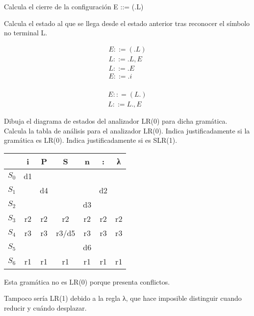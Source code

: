 \documentclass[nochap]{apuntes}
\begin{document}
\begin{problem}[3]
\ppart Calcula el cierre de la configuración E ::= (.L)

\ppart Calcula el estado al que se llega desde el estado anterior tras reconocer el símbolo no terminal L.
\solution

\spart
\begin{align*}
E ::= (.L)\\
L ::= .L,E\\
L ::= .E\\
E ::= .i\\
\end{align*}
\spart

\begin{align*}
E :: =(L.)\\
L ::= L.,E
\end{align*}
\end{problem}


\begin{problem}[4]

\ppart Dibuja el diagrama de estados del analizador LR(0) para dicha gramática.
\ppart Calcula la tabla de análisis para el analizador LR(0).
\ppart Indica justificadamente si la gramática es LR(0). Indica justificadamente si es
SLR(1).
\solution

\spart 
\spart 

\begin{tabular}{c||c|c|c|c|c|c}
    & i & P & S & n & : & λ \\\hline\hline
$S_0$  &d1 &   &   &   &   &   \\\hline
$S_1$ &   &d4 &   &   & d2&   \\\hline
$S_2$ &   &   &   & d3&   &   \\\hline
$S_3$ & r2& r2& r2& r2& r2& r2\\\hline
$S_4$ & r3& r3& r3/d5& r3& r3& r3\\\hline
$S_5$ &   &   &   &d6 &   &   \\\hline
$S_6$ &r1 &r1 &r1 &r1 &r1 &r1 
\end{tabular}

\spart Esta gramática no es LR(0) porque presenta conflictos. 

Tampoco sería LR(1) debido a la regla λ, que hace imposible distinguir cuando reducir y cuándo desplazar.
\end{problem}
\end{document}
